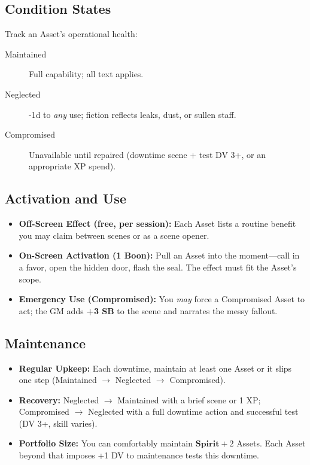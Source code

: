 \begin{multicols}{2}
\subsection*{Condition States}
Track an Asset’s operational health:
\begin{description}
  \item[Maintained] Full capability; all text applies.
  \item[Neglected] -1d to \emph{any} use; fiction reflects leaks, dust, or sullen staff.
  \item[Compromised] Unavailable until repaired (downtime scene + test DV 3+, or an appropriate XP spend).
\end{description}

\subsection*{Activation and Use}
\begin{itemize}
  \item \textbf{Off-Screen Effect (free, per session):} Each Asset lists a routine benefit you may claim between scenes or as a scene opener.
  \item \textbf{On-Screen Activation (1 Boon):} Pull an Asset into the moment—call in a favor, open the hidden door, flash the seal. The effect must fit the Asset’s scope.
  \item \textbf{Emergency Use (Compromised):} You \emph{may} force a Compromised Asset to act; the GM adds \textbf{+3 SB} to the scene and narrates the messy fallout.
\end{itemize}

\subsection*{Maintenance}
\begin{itemize}
  \item \textbf{Regular Upkeep:} Each downtime, maintain at least one Asset or it slips one step (Maintained \(\rightarrow\) Neglected \(\rightarrow\) Compromised).
  \item \textbf{Recovery:} Neglected \(\rightarrow\) Maintained with a brief scene or 1 XP; Compromised \(\rightarrow\) Neglected with a full downtime action and successful test (DV 3+, skill varies).
  \item \textbf{Portfolio Size:} You can comfortably maintain \(\textbf{Spirit} + 2\) Assets. Each Asset beyond that imposes +1 DV to maintenance tests this downtime. 
\end{itemize}


\end{multicols}
